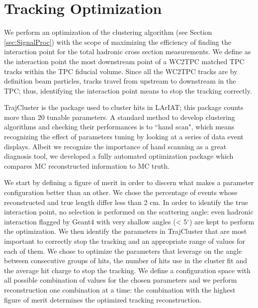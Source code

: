 \section{Tracking Optimization}\label{ch:TrackOptimization}
We perform an optimization of the clustering algorithm (see Section \ref{sec:SignalProc}) with the scope of maximizing the efficiency of finding the interaction point for the total hadronic cross section measurements. We define as the interaction point the most downstream point of a WC2TPC matched TPC tracks within the TPC fiducial volume. Since all the WC2TPC tracks are by definition beam particles, tracks travel from upstream to downstream in the TPC; thus, identifying the interaction point means to stop the tracking correctly. 

TrajCluster is the package used to cluster hits in LArIAT; this package counts more than 20 tunable parameters. A standard method to develop clustering algorithms and checking their performances is to ``hand scan", which means recognizing the effect of parameters tuning by looking at a series of data event displays. Albeit we recognize the importance of hand scanning as a great diagnosis tool, we developed a fully automated optimization package which compares MC reconstructed information to MC truth. 

We start by defining a figure of merit in order to discern what makes a parameter configuration better than an other. We chose the percentage of events whose reconstructed and true length differ less than 2 cm. In order to identify the true interaction point, no selection is performed on the scattering angle: even hadronic interaction flagged by Geant4 with very shallow angles (< 5$^\circ$) are kept to perform the optimization.
We then identify the parameters in TrajCluster that are most important to  correctly stop  the tracking and an appropriate range of values for each of them. We chose to optimize the parameters that leverage on the angle between consecutive groups of hits, the number of hits use in the cluster fit and the average hit charge to stop the tracking. We define a configuration space with all  possible combination of values for the chosen parameters and we perform reconstruction one combination at a time: the combination with the highest figure of merit determines the optimized tracking reconstruction.

